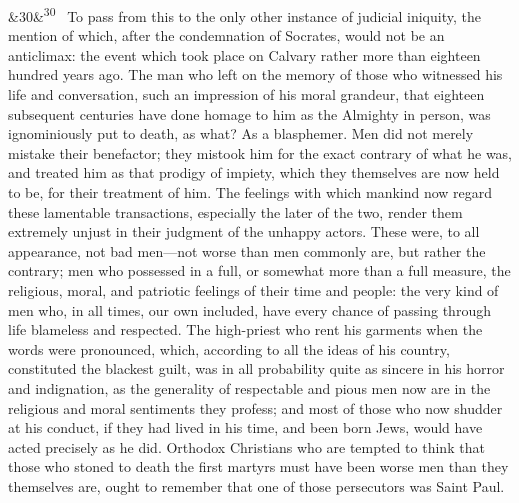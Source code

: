 \documentclass[12pt]{article}
\newcommand{\para}[1][]{\par\noindent\ifx&#1&\else\textsuperscript{\footnotesize #1}~\fi}
\begin{document}
\para[30] To pass from this to the only other instance of judicial iniquity, the mention of which, after the condemnation of Socrates, would not be an anticlimax: the event which took place on Calvary rather more than eighteen hundred years ago. The man who left on the memory of those who witnessed his life and conversation, such an impression of his moral grandeur, that eighteen subsequent centuries have done homage to him as the Almighty in person, was ignominiously put to death, as what? As a blasphemer. Men did not merely mistake their benefactor; they mistook him for the exact contrary of what he was, and treated him as that prodigy of impiety, which they themselves are now held to be, for their treatment of him. The feelings with which mankind now regard these lamentable transactions, especially the later of the two, render them extremely unjust in their judgment of the unhappy actors. These were, to all appearance, not bad men---not worse than men commonly are, but rather the contrary; men who possessed in a full, or somewhat more than a full measure, the religious, moral, and patriotic feelings of their time and people: the very kind of men who, in all times, our own included, have every chance of passing through life blameless and respected. The high-priest who rent his garments when the words were pronounced, which, according to all the ideas of his country, constituted the blackest guilt, was in all probability quite as sincere in his horror and indignation, as the generality of respectable and pious men now are in the religious and moral sentiments they profess; and most of those who now shudder at his conduct, if they had lived in his time, and been born Jews, would have acted precisely as he did. Orthodox Christians who are tempted to think that those who stoned to death the first martyrs must have been worse men than they themselves are, ought to remember that one of those persecutors was Saint Paul.
\end{document}
